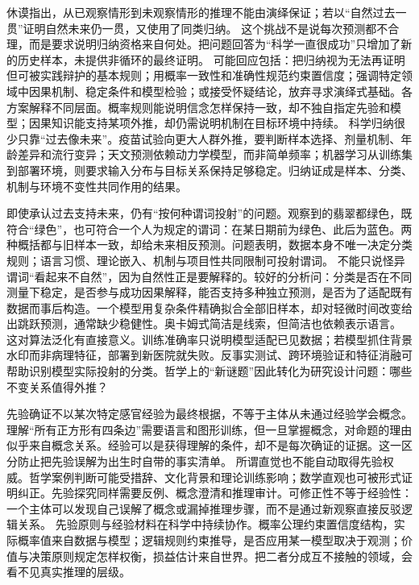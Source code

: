 休谟指出，从已观察情形到未观察情形的推理不能由演绎保证；若以“自然过去一贯”证明自然未来仍一贯，又使用了同类归纳。\parencite{hume2000} 这个挑战不是说每次预测都不合理，而是要求说明归纳资格来自何处。把问题回答为“科学一直很成功”只增加了新的历史样本，未提供非循环的最终证明。 可能回应包括：把归纳视为无法再证明但可被实践辩护的基本规则；用概率一致性和准确性规范约束置信度；强调特定领域中因果机制、稳定条件和模型检验；或接受怀疑结论，放弃寻求演绎式基础。各方案解释不同层面。概率规则能说明信念怎样保持一致，却不独自指定先验和模型；因果知识能支持某项外推，却仍需说明机制在目标环境中持续。 科学归纳很少只靠“过去像未来”。疫苗试验向更大人群外推，要判断样本选择、剂量机制、年龄差异和流行变异；天文预测依赖动力学模型，而非简单频率；机器学习从训练集到部署环境，则要求输入分布与目标关系保持足够稳定。归纳证成是样本、分类、机制与环境不变性共同作用的结果。

即使承认过去支持未来，仍有“按何种谓词投射”的问题。观察到的翡翠都绿色，既符合“绿色”，也可符合一个人为规定的谓词：在某日期前为绿色、此后为蓝色。两种概括都与旧样本一致，却给未来相反预测。问题表明，数据本身不唯一决定分类规则；语言习惯、理论嵌入、机制与项目性共同限制可投射谓词。 不能只说怪异谓词“看起来不自然”，因为自然性正是要解释的。较好的分析问：分类是否在不同测量下稳定，是否参与成功因果解释，能否支持多种独立预测，是否为了适配既有数据而事后构造。一个模型用复杂条件精确拟合全部旧样本，却对轻微时间改变给出跳跃预测，通常缺少稳健性。奥卡姆式简洁是线索，但简洁也依赖表示语言。 这对算法泛化有直接意义。训练准确率只说明模型适配已见数据；若模型抓住背景水印而非病理特征，部署到新医院就失败。反事实测试、跨环境验证和特征消融可帮助识别模型实际投射的分类。哲学上的“新谜题”因此转化为研究设计问题：哪些不变关系值得外推？

先验确证不以某次特定感官经验为最终根据，不等于主体从未通过经验学会概念。理解“所有正方形有四条边”需要语言和图形训练，但一旦掌握概念，对命题的理由似乎来自概念关系。经验可以是获得理解的条件，却不是每次确证的证据。这一区分防止把先验误解为出生时自带的事实清单。 所谓直觉也不能自动取得先验权威。哲学案例判断可能受措辞、文化背景和理论训练影响；数学直观也可被形式证明纠正。先验探究同样需要反例、概念澄清和推理审计。可修正性不等于经验性：一个主体可以发现自己误解了概念或漏掉推理步骤，而不是通过新观察直接反驳逻辑关系。 先验原则与经验材料在科学中持续协作。概率公理约束置信度结构，实际概率值来自数据与模型；逻辑规则约束推导，是否应用某一模型取决于观测；价值与决策原则规定怎样权衡，损益估计来自世界。把二者分成互不接触的领域，会看不见真实推理的层级。

